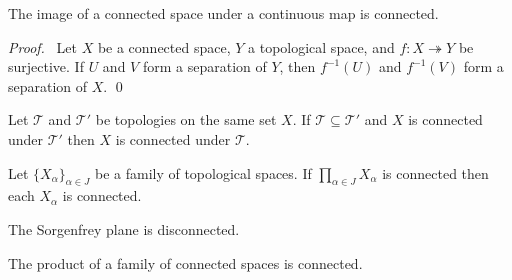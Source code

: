 \begin{thm}
  \label{thm:topology:connected:image}
  The image of a connected space under a continuous map is connected.
\end{thm}

\begin{proof}
  \pf\ Let $X$ be a connected space, $Y$ a topological space, and $f :
  X \twoheadrightarrow Y$ be surjective. If $U$ and $V$ form a separation
  of $Y$, then $f^{-1}(U)$ and $f^{-1}(V)$ form a separation of $X$. \qed
\end{proof}

\begin{cor}
  \label{cor:topology:connected:finer}
  Let $\mathcal{T}$ and $\mathcal{T}'$ be topologies on the same set $X$. If
  $\mathcal{T} \subseteq \mathcal{T}'$ and $X$ is connected under
  $\mathcal{T}'$ then $X$ is connected under $\mathcal{T}$.
\end{cor}

\begin{cor}
  Let $\{ X_\alpha \}_{\alpha \in J}$ be a family of topological spaces. If
  $\prod_{\alpha \in J} X_\alpha$ is connected then each $X_\alpha$ is
connected.
\end{cor}

\begin{cor}
 The Sorgenfrey plane is disconnected.
\end{cor}

\begin{prop}
  \label{prop:topology:connected:product}
  The product of a family of connected spaces is connected.
\end{prop}

